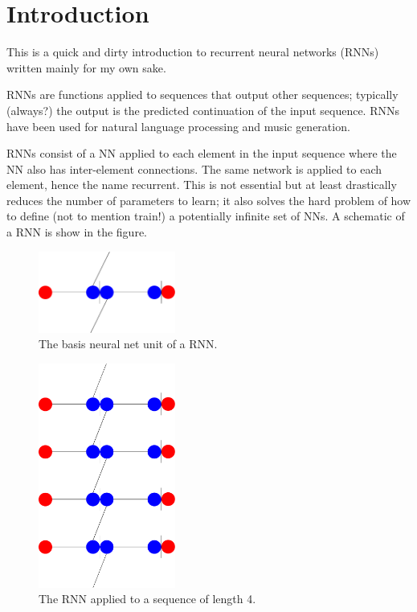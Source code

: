 \documentclass[12pt]{article}
\numberwithin{equation}{section}
\begin{document}
\section{Introduction}
This is a quick and dirty introduction to recurrent neural networks (RNNs) written mainly for my own sake.

RNNs are functions applied to sequences that output other sequences; typically (always?) the output is the predicted continuation of the input sequence. RNNs have been used for natural language processing and music generation. 

RNNs consist of a NN applied to each element in the input sequence where the NN also has inter-element connections. The same network is applied to each element, hence the name recurrent. This is not essential but at least drastically reduces the number of parameters to learn; it also solves the hard problem of how to define (not to mention train!) a potentially infinite set of NNs. A schematic of a RNN is show in the figure. 


\begin{figure}[H]
\centering
\includegraphics[width=0.4\textwidth]{RNNBasicUnit.pdf}
\caption{The basis neural net unit of a RNN.}
\end{figure}



\begin{figure}[H]
\centering
\includegraphics[width=0.4\textwidth]{RNNFull.pdf}
\caption{The RNN applied to a sequence of length 4.}
\end{figure}
\end{document}
